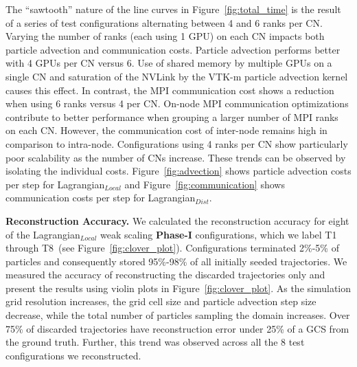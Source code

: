 %
%
The ``sawtooth'' nature of the line curves in Figure~\ref{fig:total_time} is the result of a series of test configurations alternating between 4 and 6 ranks per CN.
%
Varying the number of ranks (each using 1 GPU) on each CN impacts both particle advection and communication costs.
%
%
%
%
Particle advection performs better with 4 GPUs per CN versus 6.
%
Use of shared memory by multiple GPUs on a single CN and saturation of the NVLink by the VTK-m particle advection kernel causes this effect.
%
%
%
In contrast, the MPI communication cost shows a reduction when using 6 ranks versus 4 per CN. 
%
%
On-node MPI communication optimizations contribute to better performance when grouping a larger number of MPI ranks on each CN. 
%
However, the communication cost of inter-node remains high in comparison to intra-node.
%
Configurations using 4 ranks per CN show particularly poor scalability as the number of CNs increase.
%
%
These trends can be observed by isolating the individual costs. 
%
Figure~\ref{fig:advection} shows particle advection costs per step for Lagrangian$_{Local}$ and Figure~\ref{fig:communication} shows communication costs per step for Lagrangian$_{Dist}$. 

\textbf{Reconstruction Accuracy.}
We calculated the reconstruction accuracy for eight of the Lagrangian$_{Local}$ weak scaling \textbf{Phase-I} configurations, which we label T1 through T8~(see Figure~\ref{fig:clover_plot}). 
%
Configurations terminated 2\%-5\% of particles and consequently stored 95\%-98\% of all initially seeded trajectories. 
%
We measured the accuracy of reconstructing the discarded trajectories only and present the results using violin plots in Figure~\ref{fig:clover_plot}.
%
As the simulation grid resolution increases, the grid cell size and particle advection step size decrease, while the total number of particles sampling the domain increases. 
%
Over 75\% of discarded trajectories have reconstruction error under 25\% of a GCS from the ground truth.
%
Further, this trend was observed across all the 8 test configurations we reconstructed. 

